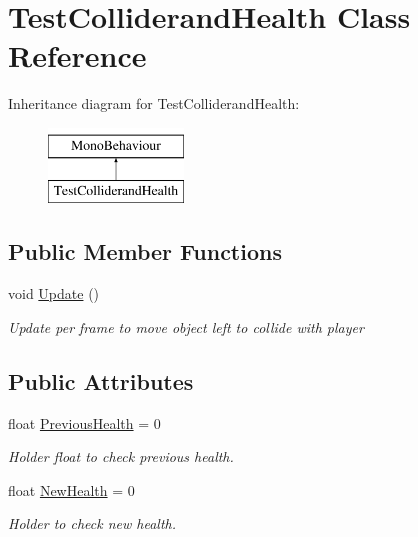 \hypertarget{classTestColliderandHealth}{\section{Test\-Colliderand\-Health Class Reference}
\label{classTestColliderandHealth}
}
Inheritance diagram for Test\-Colliderand\-Health\-:\begin{figure}[H]
\begin{center}
\leavevmode
\includegraphics[height=2.000000cm]{classTestColliderandHealth}
\end{center}
\end{figure}
\subsection*{Public Member Functions}
\begin{DoxyCompactItemize}
\item 
void \hyperlink{classTestColliderandHealth_acbf64a959cd451b47dcc7907999f8b50}{Update} ()
\begin{DoxyCompactList}\small\item\em Update per frame to move object left to collide with player \end{DoxyCompactList}\end{DoxyCompactItemize}
\subsection*{Public Attributes}
\begin{DoxyCompactItemize}
\item 
float \hyperlink{classTestColliderandHealth_a4de3c72b663ad686bb26ebfde82b5889}{Previous\-Health} = 0
\begin{DoxyCompactList}\small\item\em Holder float to check previous health. \end{DoxyCompactList}\item 
float \hyperlink{classTestColliderandHealth_add667d40823d533cf1d256ef3b380fe8}{New\-Health} = 0
\begin{DoxyCompactList}\small\item\em Holder to check new health. \end{DoxyCompactList}\end{DoxyCompactItemize}


